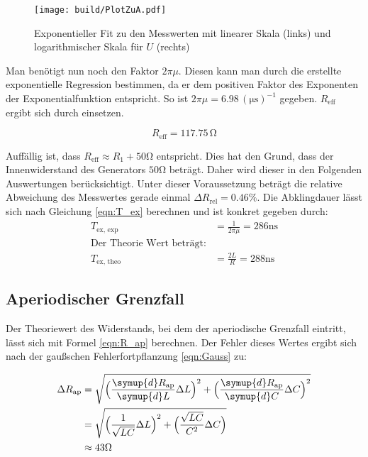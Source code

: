 \begin{figure}
  \centering
  \texttt{[image: build/PlotZuA.pdf]}
  \caption{Exponentieller Fit \cite{scipy} zu den Messwerten mit linearer Skala (links) und logarithmischer Skala für $U$ (rechts)}
  \label{fig:PlotZuA}
\end{figure}

Man benötigt nun noch den Faktor $2\pi\mu$. Diesen kann man durch die erstellte exponentielle Regression 
bestimmen, da er dem positiven Faktor des Exponenten der Exponentialfunktion entspricht. 
So ist $2\pi\mu = 6.98\, (\unit{\micro\second})^{-1}$ gegeben.
$R_{\text{eff}}$ ergibt sich durch einsetzen.

\begin{equation*}
  R_{\text{eff}} = 117.75\,\unit{\ohm}
\end{equation*}

Auffällig ist, dass $R_{\text{eff}} \approx R_1 + 50\unit{\ohm}$ entspricht. Dies hat den Grund, dass der Innenwiderstand des Generators
$50 \unit{\ohm}$ beträgt. Daher wird dieser in den Folgenden Auswertungen berücksichtigt. Unter dieser Voraussetzung beträgt die relative Abweichung des Messwertes
gerade einmal $\Delta R_{\text{rel}} = 0.46\%$.
Die Abklingdauer lässt sich nach Gleichung \eqref{eqn:T_ex} berechnen und ist konkret gegeben durch:
\begin{align*}
  T_{\text{ex, exp}} &= \frac{1}{2\pi\mu} = 286 \unit{\nano\second} \\
  \text{Der Theorie Wert beträgt:} \\
  T_{\text{ex, theo}} &= \frac{2L}{R} = 288 \unit{\nano\second}
\end{align*}

\subsection{Aperiodischer Grenzfall}
\label{subsec:AuswertungB}

Der Theoriewert des Widerstands, bei dem der aperiodische Grenzfall eintritt, lässt sich mit Formel \eqref{eqn:R_ap} berechnen.
Der Fehler dieses Wertes ergibt sich nach der gaußschen Fehlerfortpflanzung \eqref{eqn:Gauss} zu:

\begin{align*}
  \label{eqn:err_R_ap}
  \Delta R_{\text{ap}} &= \sqrt{\Bigl(\frac{\symup{d}R_{\text{ap}}}{\symup{d}L}\Delta L \Bigr)^2+\Bigl(\frac{\symup{d}R_{\text{ap}}}{\symup{d}C}\Delta C\Bigr)^2} \\
  &= \sqrt{\Bigl(\frac{1}{\sqrt{LC}}\Delta L\Bigr)^2+\Bigl(\frac{\sqrt{LC}}{C^2}\Delta C\Bigr)} \\
  &\approx 43 \unit{\ohm}
\end{align*}

